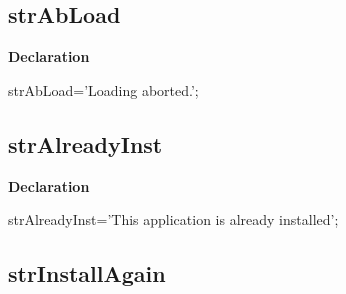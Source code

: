 \documentclass{report}
\newif\ifpdf
\begin{document}
\subsection*{strAbLoad}
\fi
\label{trstrings-strAbLoad}
\begin{list}{}{
\setlength{\itemindent}{0cm}
\setlength{\listparindent}{0cm}
\setlength{\leftmargin}{\evensidemargin}
\addtolength{\leftmargin}{\tmplength}
\settowidth{\labelsep}{X}
\addtolength{\leftmargin}{\labelsep}
\setlength{\labelwidth}{\tmplength}
}
\item[\textbf{Declaration}\hfill]
\ifpdf
\begin{flushleft}
\fi
\begin{ttfamily}
strAbLoad='Loading aborted.';\end{ttfamily}

\ifpdf
\end{flushleft}
\fi

\end{list}
\ifpdf
\subsection*{\large{\textbf{strAlreadyInst}}\normalsize\hspace{1ex}\hrulefill}
\else
\subsection*{strAlreadyInst}
\fi
\label{trstrings-strAlreadyInst}
\begin{list}{}{
\setlength{\itemindent}{0cm}
\setlength{\listparindent}{0cm}
\setlength{\leftmargin}{\evensidemargin}
\addtolength{\leftmargin}{\tmplength}
\settowidth{\labelsep}{X}
\addtolength{\leftmargin}{\labelsep}
\setlength{\labelwidth}{\tmplength}
}
\item[\textbf{Declaration}\hfill]
\ifpdf
\begin{flushleft}
\fi
\begin{ttfamily}
strAlreadyInst='This application is already installed';\end{ttfamily}

\ifpdf
\end{flushleft}
\fi

\end{list}
\ifpdf
\subsection*{\large{\textbf{strInstallAgain}}\normalsize\hspace{1ex}\hrulefill}
\else
\end{document}
